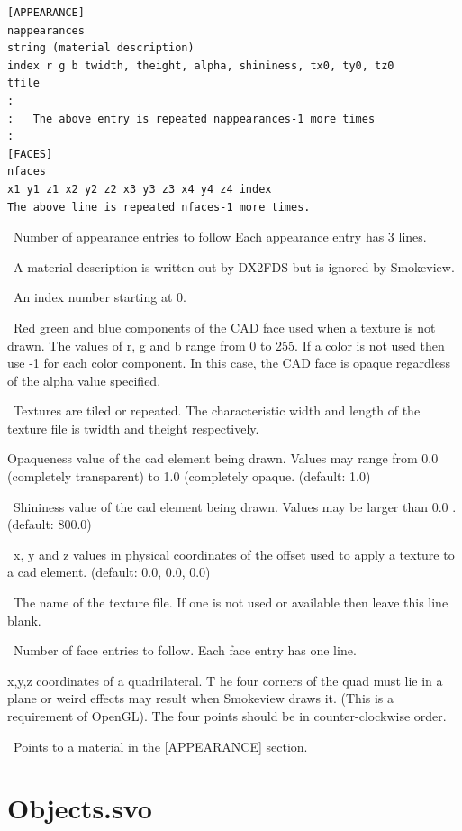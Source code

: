 \documentclass[11pt,twoside]{book}
\newcommand{\parma}{.75}
\newcommand{\parmb}{.5}
\newcommand{\parmc}{0.25}
\newcommand{\blist}{
\begin{list}
{}{
\setlength{\leftmargin}{\parma in}
\setlength{\labelwidth}{\parmb in}
\setlength{\labelsep}{\parmc in}
\setlength{\listparindent}{0.3in}
\setlength{\topsep}{.3in}
\setlength{\parsep}{.0in}
}}
\newcommand{\elist}{\end{list}}
\newcommand{\hitem}[1]{\item[{\bf #1} \hfill]}
\begin{document}
\begin{lstlisting}
[APPEARANCE]
nappearances
string (material description)
index r g b twidth, theight, alpha, shininess, tx0, ty0, tz0
tfile
:
:   The above entry is repeated nappearances-1 more times
:
[FACES]
nfaces
x1 y1 z1 x2 y2 z2 x3 y3 z3 x4 y4 z4 index
The above line is repeated nfaces-1 more times.
\end{lstlisting}

\blist

\hitem{nappearances}\ Number of appearance entries to follow
Each appearance entry has 3 lines.
\hitem{string}\ A material description is written out by DX2FDS but is ignored by Smokeview.
\hitem{index}\ An index number starting at 0.
\hitem{r, g, b}\ Red green and blue components of the CAD face used when a texture is not drawn.
The values of r, g and b range from 0 to 255.  If a color is not used
then use -1 for each color component.  In this case, the CAD face is opaque regardless of the alpha value specified.
\hitem{twidth, theight}\ Textures are tiled or repeated.
The characteristic width and length of the
texture file is twidth and theight respectively.
\hitem{alpha}Opaqueness value of the cad element being drawn.
Values may range from 0.0 (completely transparent)
to 1.0 (completely opaque.  (default: 1.0)
\hitem{shininess}\ Shininess value of the cad element being drawn.
Values may be larger than 0.0 .  (default: 800.0)
\hitem{tx0, ty0, tz0}\ x, y and z values in physical coordinates of the offset used to apply a
texture to a cad element. (default: 0.0, 0.0, 0.0)
\hitem{tfile}\ The name of the texture file.  If one is not used or
available then leave this line blank.
\hitem{nfaces}\ Number of face entries to follow.  Each face entry has one line.
\hitem{x1/y1/z1/.../x4/y4/z4}x,y,z coordinates of a quadrilateral.  T
he four corners of the quad
must lie in a plane or weird effects may result when Smokeview draws it.
(This is a requirement
of OpenGL).  The four points should be in counter-clockwise order.
\hitem{index}\ Points to a material in the [APPEARANCE] section.
\elist

\section{Objects.svo}
\label{section:objects}

\end{document}
